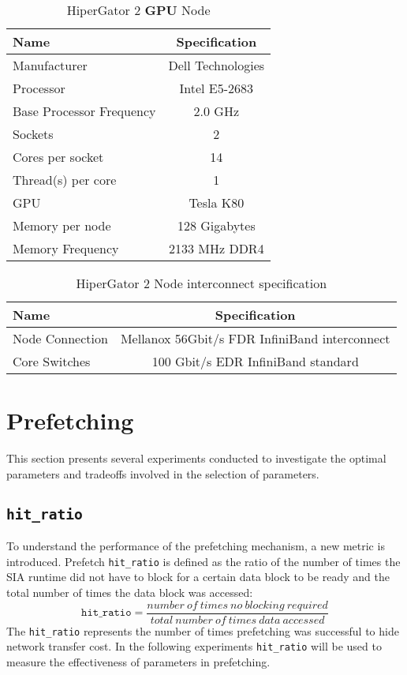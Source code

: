 \begin{table}[h]
  \centering
  \caption{HiperGator 2 \textbf{GPU} Node}
  \begin{tabular}{l c}
    \hline
    Name                       & Specification     \\
    \hline
    Manufacturer               & Dell Technologies \\
    Processor                  & Intel E5-2683     \\
    Base Processor Frequency   & 2.0 GHz           \\
    Sockets                    & 2                 \\
    Cores per socket           & 14                \\
    Thread(s) per core         & 1                 \\
    GPU                        & Tesla K80         \\
    Memory per node            & 128 Gigabytes     \\
    Memory Frequency           & 2133 MHz DDR4     \\
    \hline
  \end{tabular}
  \label{tab:hpggpuspecs}
\end{table}

\begin{table}[h]
  \centering
  \caption{HiperGator 2 Node interconnect specification}
  \begin{tabular}{l c}
    \hline
    Name             & Specification                                 \\
    \hline
    Node Connection  & Mellanox 56Gbit/s FDR InfiniBand interconnect \\
    Core Switches    & 100 Gbit/s EDR InfiniBand standard            \\
    \hline
  \end{tabular}
  \label{tab:hpgconnectspecs}
\end{table}

\section{Prefetching}
This section presents several experiments conducted to investigate the optimal
parameters and tradeoffs involved in the selection of parameters.

\subsection{\texttt{hit\_ratio}}\label{sec:hit_ratio}
To understand the performance of the prefetching mechanism, a new metric is introduced.
Prefetch \texttt{hit\_ratio} is defined as the ratio of the number of times the
SIA runtime did not have to block for a certain data block to be ready and the total
number of times the data block was accessed:
\[
  \texttt{hit\_ratio} = \frac{number~of~times~no~blocking~required}{total~number~of~times~data~accessed}
\]
The \texttt{hit\_ratio} represents the number of times prefetching was successful
to hide network transfer cost. In the following experiments \texttt{hit\_ratio}
will be used to measure the effectiveness of parameters in prefetching.

